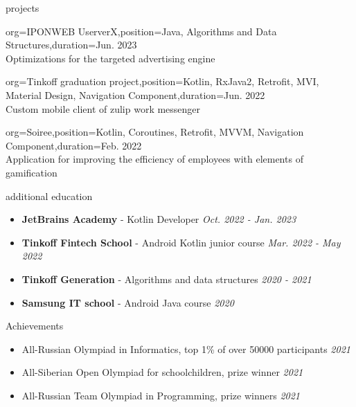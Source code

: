 \documentclass{resume}
\begin{document}
\begin{ResumeSection}{projects}
\begin{ResumeSubsection}{org=IPONWEB UserverX,position={Java, Algorithms and Data Structures},duration={Jun. 2023}} \\
Optimizations for the targeted advertising engine \vspace{4pt}

\end{ResumeSubsection}

\begin{ResumeSubsection}{org=Tinkoff graduation project,position={Kotlin, RxJava2, Retrofit, MVI, Material Design, Navigation Component},duration={Jun. 2022}} \\
Custom mobile client of zulip work messenger \vspace{4pt}

\end{ResumeSubsection}
\begin{ResumeSubsection}{org=Soiree,position={Kotlin, Coroutines, Retrofit, MVVM, Navigation Component},duration={Feb. 2022}} \\
Application for improving the efficiency of employees with elements of gamification \vspace{4pt}
\end{ResumeSubsection}
\end{ResumeSection}

\begin{ResumeSection}{additional education}
    \newcommand{\school}[2]{\textbf{#1} - #2}
    \begin{itemize}
        \item \school{JetBrains Academy}{Kotlin Developer} \em\hfill{Oct. 2022 - Jan. 2023}\em
        \item \school{Tinkoff Fintech School}{Android Kotlin junior course}  \em\hfill{Mar. 2022 - May 2022}\em
        \item \school{Tinkoff Generation}{Algorithms and data structures} \em\hfill{2020 - 2021}\em
        \item \school{Samsung IT school}{Android Java course} \em\hfill{2020}\em
    \end{itemize}
\end{ResumeSection}
\begin{ResumeSection}{Achievements}
\begin{itemize}
  \item All-Russian Olympiad in Informatics, top 1\% of over 50000 participants \em\hfill{2021}\em
  \item All-Siberian Open Olympiad for schoolchildren, prize winner \em\hfill{2021}\em
  \item All-Russian Team Olympiad in Programming, prize winners \em\hfill{2021}\em
\end{itemize}
\end{ResumeSection}
\end{document}
